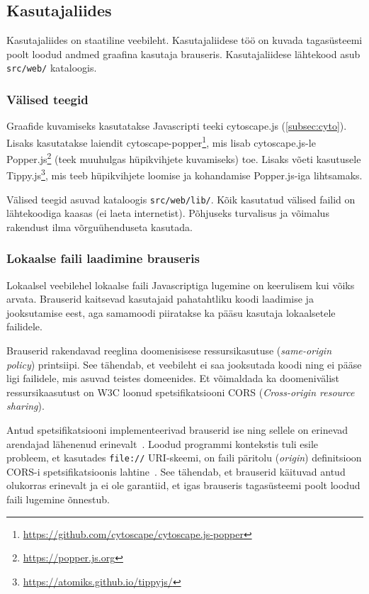 \documentclass[12pt]{article}
\begin{document}
\subsection{Kasutajaliides}
Kasutajaliides on staatiline veebileht.
Kasutajaliidese töö on kuvada tagasüsteemi poolt loodud andmed graafina kasutaja brauseris.
Kasutajaliidese lähtekood asub \texttt{src/web/} kataloogis.

\subsubsection{Välised teegid} \label{libsUsedInUI}
Graafide kuvamiseks kasutatakse Javascripti teeki cytoscape.js (\ref{subsec:cyto}).
Lisaks kasutatakse laiendit
cytoscape-popper\footnote{\url{https://github.com/cytoscape/cytoscape.js-popper}}, mis lisab
cytoscape.js-le Popper.js\footnote{\url{https://popper.js.org}} (teek muuhulgas hüpikvihjete
kuvamiseks) toe.
Lisaks võeti kasutusele Tippy.js\footnote{\url{https://atomiks.github.io/tippyjs/}},
mis teeb hüpikvihjete loomise ja kohandamise Popper.js-iga lihtsamaks.

Välised teegid asuvad kataloogis \texttt{src/web/lib/}.
Kõik kasutatud välised failid on lähtekoodiga kaasas (ei laeta internetist).
Põhjuseks turvalisus ja võimalus rakendust ilma võrguühenduseta kasutada.

\subsubsection{Lokaalse faili laadimine brauseris}
Lokaalsel veebilehel lokaalse faili Javascriptiga lugemine on keerulisem kui võiks arvata.
Brauserid kaitsevad kasutajaid pahatahtliku koodi laadimise ja jooksutamise eest, aga samamoodi
piiratakse ka pääsu kasutaja lokaalsetele failidele.

Brauserid rakendavad reeglina doomenisisese ressursikasutuse (\textit{same-origin policy})
printsiipi.
See tähendab, et veebileht ei saa jooksutada koodi ning ei pääse ligi failidele, mis asuvad
teistes domeenides.
Et võimaldada ka doomenivälist ressursikaasutust on W3C loonud spetsifikatsiooni CORS
(\textit{Cross-origin resource sharing}).
~\cite{w3CORS}

Antud spetsifikatsiooni implementeerivad brauserid ise ning sellele on erinevad arendajad
lähenenud erinevalt~\cite{localWebSec}.
Loodud programmi kontekstis tuli esile probleem, et kasutades \texttt{file://} URI-skeemi, on faili
päritolu (\textit{origin}) definitsioon CORS-i spetsifikatsioonis
lahtine~\cite[peatükk 4, punkt 4]{ietfOrigin}.
See tähendab, et brauserid käituvad antud olukorras erinevalt ja ei ole garantiid, et igas
brauseris tagasüsteemi poolt loodud faili lugemine õnnestub.
\end{document}
